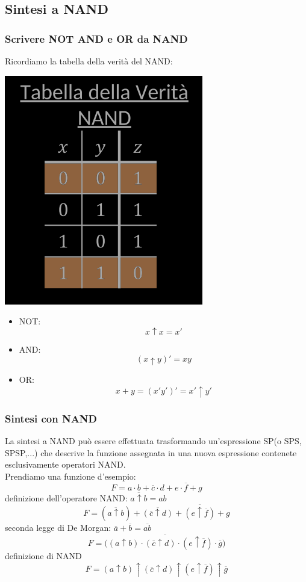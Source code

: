 \documentclass{article}
\begin{document}
\subsection{Sintesi a NAND}
\subsubsection{Scrivere NOT AND e OR da NAND}
Ricordiamo la tabella della verità del NAND:
\begin{center}
    \includegraphics[scale=0.5]{tdvnand.png}
\end{center}
\begin{itemize}
    \item NOT: $$x \uparrow x = x'$$
    \item AND: $$ (x \uparrow y)' = xy $$
    \item OR: $$ x+y=(x'y')' = x' \uparrow y' $$
\end{itemize}
\subsubsection{Sintesi con NAND}
La sintesi a NAND può essere effettuata trasformando un'espressione SP(o SPS, SPSP,...) che descrive la funzione assegnata in una nuova espressione contenete esclusivamente operatori NAND.
\vspace{0.2cm}\\
Prendiamo una funzione d'esempio:
$$ F = a \cdot b + \overline{c} \cdot d + e \cdot \overline{f} +g $$
definizione dell'operatore NAND: $ \overline{a \uparrow b }= ab$
$$ F = (\overline{a \uparrow b }) + \overline{(\overline{c} \uparrow d)} + \overline{(e \uparrow \overline{f})} + g $$
 seconda legge di De Morgan: $\overline{a} + \overline{b} = \overline{ab}$
$$ F = \overline{\Big( (a \uparrow b) \cdot (\overline{c} \uparrow d) \cdot (e \uparrow \overline{f}) \cdot \overline{g} \Big)} $$
definizione di NAND
$$ F = (a \uparrow b) \uparrow (\overline{c} \uparrow d) \uparrow (e \uparrow \overline{f}) \uparrow \overline{g} $$
\end{document}
